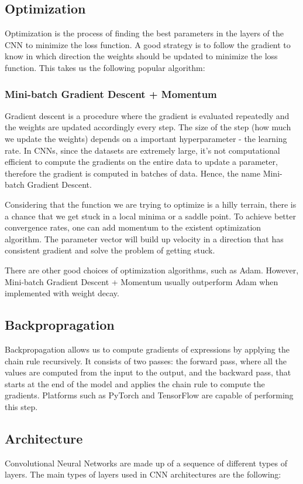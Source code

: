 \documentclass[10pt,a4paper]{article}
\begin{document}
\subsection{Optimization}
Optimization is the process of finding the best parameters in the layers of the CNN to minimize the loss function. A good strategy is to follow the gradient to know in which direction the weights should be updated to minimize the loss function. This takes us the following popular algorithm:

\subsubsection{Mini-batch Gradient Descent + Momentum}
Gradient descent is a procedure where the gradient is evaluated repeatedly and the weights are updated accordingly every step. The size of the step (how much we update the weights) depends on a important hyperparameter - the learning rate. In CNNs, since the datasets are extremely large, it's not computational efficient to compute the gradients on the entire data to update a parameter, therefore the gradient is computed in batches of data. Hence, the name Mini-batch Gradient Descent.

Considering that the function we are trying to optimize is a hilly terrain, there is a chance that we get stuck in a local minima or a saddle point. To achieve better convergence rates, one can add momentum to the existent optimization algorithm. The parameter vector will build up velocity in a direction that has consistent gradient and solve the problem of getting stuck.

There are other good choices of optimization algorithms, such as Adam\cite{kingma2014adam}. However, Mini-batch Gradient Descent + Momentum usually outperform Adam when implemented with weight decay.

\subsection{Backpropragation}
Backpropagation allows us to compute gradients of expressions by applying the chain rule recursively. It consists of two passes: the forward pass, where all the values are computed from the input to the output, and the backward pass, that starts at the end of the model and applies the chain rule to compute the gradients. Platforms such as PyTorch and TensorFlow are capable of performing this step.

\subsection{Architecture}
Convolutional Neural Networks are made up of a sequence of different types of layers. The main types of layers used in CNN architectures are the following:
\end{document}
